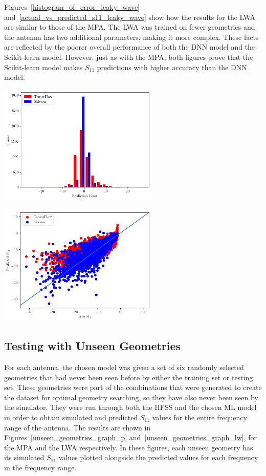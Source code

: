 \documentclass[conference]{IEEEtran}
\newenvironment{Figure}
    {\par\medskip\noindent\minipage{\linewidth}}
    {\endminipage\par\medskip}
\begin{document}
Figures~\ref{histogram_of_error_leaky_wave} and~\ref{actual_vs_predicted_s11_leaky_wave} show how the results for the LWA are similar to those of the MPA. The LWA was trained on fewer geometries and the antenna has two additional parameters, making it more complex. These facts are reflected by the poorer overall performance of both the DNN model and the Scikit-learn model. However, just as with the MPA, both figures prove that the Scikit-learn model makes $S_{11}$ predictions with higher accuracy than the DNN model.

\begin{Figure}
    \centering
    \includegraphics[width=3in]{histogram_leaky_wave}
    \label{histogram_of_error_leaky_wave}
\end{Figure}

\begin{Figure}
    \centering
    \includegraphics[width=3in]{actual_vs_predicted_s11_leaky_wave}
    \label{actual_vs_predicted_s11_leaky_wave}
\end{Figure}

\subsection{Testing with Unseen Geometries}
For each antenna, the chosen model was given a set of six randomly selected geometries that had never been seen before by either the training set or testing set. These geometries were part of the combinations that were generated to create the dataset for optimal geometry searching, so they have also never been seen by the simulator. They were run through both the HFSS and the chosen ML model in order to obtain simulated and predicted $S_{11}$ values for the entire frequency range of the antenna. The results are shown in Figures~\ref{unseen_geometries_graph_p} and~\ref{unseen_geometries_graph_lw}, for the MPA and the LWA respectively. In these figures, each unseen geometry has its simulated $S_{11}$ values plotted alongside the predicted values for each frequency in the frequency range.
\end{document}
